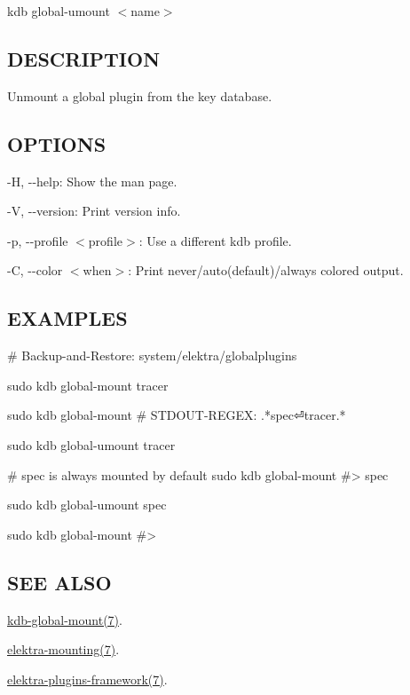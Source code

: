 {\ttfamily kdb global-\/umount $<$name$>$}

\subsection*{D\+E\+S\+C\+R\+I\+P\+T\+I\+ON}

Unmount a global plugin from the key database.

\subsection*{O\+P\+T\+I\+O\+NS}


\begin{DoxyItemize}
\item {\ttfamily -\/H}, {\ttfamily -\/-\/help}\+: Show the man page.
\item {\ttfamily -\/V}, {\ttfamily -\/-\/version}\+: Print version info.
\item {\ttfamily -\/p}, {\ttfamily -\/-\/profile $<$profile$>$}\+: Use a different kdb profile.
\item {\ttfamily -\/C}, {\ttfamily -\/-\/color $<$when$>$}\+: Print never/auto(default)/always colored output.
\end{DoxyItemize}

\subsection*{E\+X\+A\+M\+P\+L\+ES}


\begin{DoxyCode}
# Backup-and-Restore: system/elektra/globalplugins

sudo kdb global-mount tracer

sudo kdb global-mount
# STDOUT-REGEX: .*spec⏎tracer.*

sudo kdb global-umount tracer

# spec is always mounted by default
sudo kdb global-mount
#> spec

sudo kdb global-umount spec

sudo kdb global-mount
#>
\end{DoxyCode}


\subsection*{S\+EE A\+L\+SO}


\begin{DoxyItemize}
\item \hyperlink{md_doc_help_kdb-global-mount_doc_help_kdb-global-mount_md}{kdb-\/global-\/mount(7)}.
\item \hyperlink{md_doc_help_elektra-mounting_doc_help_elektra-mounting_md}{elektra-\/mounting(7)}.
\item \hyperlink{doc_dev_plugins-framework_md}{elektra-\/plugins-\/framework(7)}. 
\end{DoxyItemize}